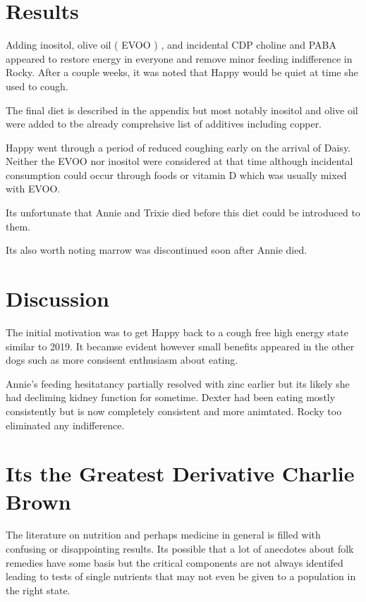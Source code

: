 \section{ Results }

Adding inositol, olive oil ( EVOO ) , and incidental CDP choline
and PABA appeared to restore energy in  everyone
and remove minor feeding indifference
in Rocky.  After a couple weeks, it was noted that Happy would be quiet
at time she used to cough. 


The final diet is described in the appendix   but most notably
inositol and olive oil were added to tbe already comprehsive list
of additives including copper.

Happy went through a period of reduced coughing early on the arrival
of Daisy. Neither the EVOO nor inositol were considered at that time
although incidental consumption could occur through foods or vitamin
D which was usually mixed with EVOO. 

Its unfortunate that Annie and Trixie died before this diet could
be introduced to them.

Its also worth noting marrow was discontinued soon after Annie died.


\mjmtol{
}

\section{Discussion}
The initial motivation was to get Happy back to a cough free high
energy state similar to 2019. It becamse evident however small
benefits appeared in the other dogs such as more consisent enthusiasm
about eating. 

Annie's feeding hesitatancy partially resolved with zinc earlier but
its likely she had decliming kidney function for sometime. Dexter had
been eating mostly consistently but is now completely consistent and
more animtated. Rocky too eliminated any indifference. 





\section{Its the Greatest Derivative Charlie Brown }

The literature on nutrition and perhaps medicine in general
is filled with confusing or disappointing results. 
Its possible that a lot of anecdotes about folk remedies have
some basis but the critical components are not always identifed
leading to tests of single nutrients that may not even be given
to a population in the right state. 

